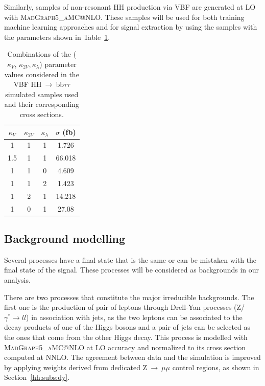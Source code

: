 \documentclass[../main.tex]{subfiles}
\begin{document}
Similarly, samples of non-resonant HH production via VBF are generated at LO with \textsc{MadGraph5\_aMC@NLO}. These samples will be used for both training machine learning approaches and for signal extraction by using the samples with the parameters shown in Table~\ref{hh:analysis:vbf_samples}.

\begin{table}[h!]
\begin{center}
\begin{tabular}{c | c | c | c}
$\kappa_V$ & $\kappa_{2V}$ & $\kappa_\lambda$ & $\sigma$ (fb) \\ \hline
1   & 1 & 1 & 1.726 \\
1.5 & 1 & 1 & 66.018 \\
1   & 1 & 0 & 4.609 \\
1   & 1 & 2 & 1.423 \\
1   & 2 & 1 & 14.218 \\
1   & 0 & 1 & 27.08
\end{tabular}
\caption{Combinations of the ($\kappa_V$, $\kappa_{2V}, \kappa_\lambda$) parameter values considered in the VBF HH$~\to~$bb$\tau\tau$ simulated samples used and their corresponding cross sections.}
\label{hh:analysis:vbf_samples}
\end{center}
\end{table}

\subsection{Background modelling}

Several processes have a final state that is the same or can be mistaken with the final state of the signal. These processes will be considered as backgrounds in our analysis.

There are two processes that constitute the major irreducible backgrounds. The first one is the production of pair of leptons through Drell-Yan processes (Z/$\gamma^*\to ll$) in association with jets, as the two leptons can be associated to the decay products of one of the Higgs bosons and a pair of jets can be selected as the ones that come from the other Higgs decay. This process is modelled with \textsc{MadGraph5\_aMC@NLO} at LO accuracy and normalized to its cross section computed at NNLO. The agreement between data and the simulation is improved by applying weights derived from dedicated Z$~\to~\mu\mu$ control regions, as shown in Section~\ref{hh:subs:dy}.
\end{document}
